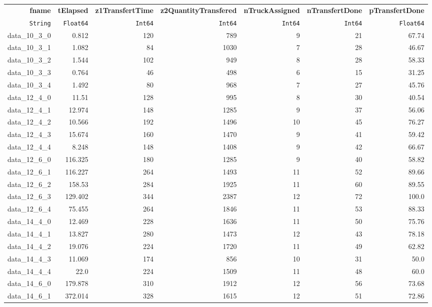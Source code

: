 \begin{tabular}{rrrrrrr}
  \hline
  \textbf{fname} & \textbf{tElapsed} & \textbf{z1TransfertTime} & \textbf{z2QuantityTransfered} & \textbf{nTruckAssigned} & \textbf{nTransfertDone} & \textbf{pTransfertDone} \\
  \texttt{String} & \texttt{Float64} & \texttt{Int64} & \texttt{Int64} & \texttt{Int64} & \texttt{Int64} & \texttt{Float64} \\\hline
  data\_10\_3\_0 & 0.812 & 120 & 789 & 9 & 21 & 67.74 \\
  data\_10\_3\_1 & 1.082 & 84 & 1030 & 7 & 28 & 46.67 \\
  data\_10\_3\_2 & 1.544 & 102 & 949 & 8 & 28 & 58.33 \\
  data\_10\_3\_3 & 0.764 & 46 & 498 & 6 & 15 & 31.25 \\
  data\_10\_3\_4 & 1.492 & 80 & 968 & 7 & 27 & 45.76 \\
  data\_12\_4\_0 & 11.51 & 128 & 995 & 8 & 30 & 40.54 \\
  data\_12\_4\_1 & 12.974 & 148 & 1285 & 9 & 37 & 56.06 \\
  data\_12\_4\_2 & 10.566 & 192 & 1496 & 10 & 45 & 76.27 \\
  data\_12\_4\_3 & 15.674 & 160 & 1470 & 9 & 41 & 59.42 \\
  data\_12\_4\_4 & 8.248 & 148 & 1408 & 9 & 42 & 66.67 \\
  data\_12\_6\_0 & 116.325 & 180 & 1285 & 9 & 40 & 58.82 \\
  data\_12\_6\_1 & 116.227 & 264 & 1493 & 11 & 52 & 89.66 \\
  data\_12\_6\_2 & 158.53 & 284 & 1925 & 11 & 60 & 89.55 \\
  data\_12\_6\_3 & 129.402 & 344 & 2387 & 12 & 72 & 100.0 \\
  data\_12\_6\_4 & 75.455 & 264 & 1846 & 11 & 53 & 88.33 \\
  data\_14\_4\_0 & 12.469 & 228 & 1636 & 11 & 50 & 75.76 \\
  data\_14\_4\_1 & 13.827 & 280 & 1473 & 12 & 43 & 78.18 \\
  data\_14\_4\_2 & 19.076 & 224 & 1720 & 11 & 49 & 62.82 \\
  data\_14\_4\_3 & 11.069 & 174 & 856 & 10 & 31 & 50.0 \\
  data\_14\_4\_4 & 22.0 & 224 & 1509 & 11 & 48 & 60.0 \\
  data\_14\_6\_0 & 179.878 & 310 & 1912 & 12 & 56 & 73.68 \\
  data\_14\_6\_1 & 372.014 & 328 & 1615 & 12 & 51 & 72.86 \\

\end{tabular}
